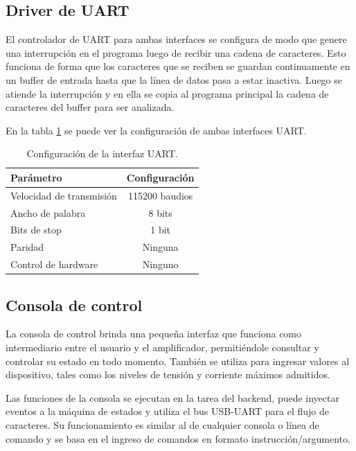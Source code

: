 \subsection{Driver de UART}

El controlador de UART para ambas interfaces se configura de modo que genere una interrupción en el programa luego de recibir una cadena de caracteres. Esto funciona de forma que los caracteres que se reciben se guardan continuamente en un buffer de entrada hasta que la línea de datos pasa a estar inactiva. Luego se atiende la interrupción y en ella se copia al programa principal la cadena de caracteres del buffer para ser analizada.

En la tabla \ref{tab:configUART} se puede ver la configuración de ambas interfaces UART.

\begin{table}[H]
	\centering
	\caption{Configuración de la interfaz UART.}
	\begin{tabular}{l c}
		\toprule
		\textbf{Parámetro} & \textbf{Configuración} \\
		\midrule
		Velocidad de transmisión	& 115200 baudios \\
		Ancho de palabra 				& 8 bits \\
		Bits de stop						& 1 bit \\
		Paridad							    & Ninguna \\
		Control de hardware			& Ninguno \\
		\bottomrule
		\hline
	\end{tabular}
	\label{tab:configUART}
\end{table}

\subsection{Consola de control}


La consola de control brinda una pequeña interfaz que funciona como intermediario entre el usuario y el amplificador, permitiéndole consultar y controlar su estado en todo momento. También se utiliza para ingresar valores al dispositivo, tales como los niveles de tensión y corriente máximos admitidos.

Las funciones de la consola se ejecutan en la tarea del backend, puede inyectar eventos a la máquina de estados y utiliza el bus USB-UART para el flujo de caracteres. Su funcionamiento es similar al de cualquier consola o línea de comando y se basa en el ingreso de comandos en formato instrucción/argumento.

